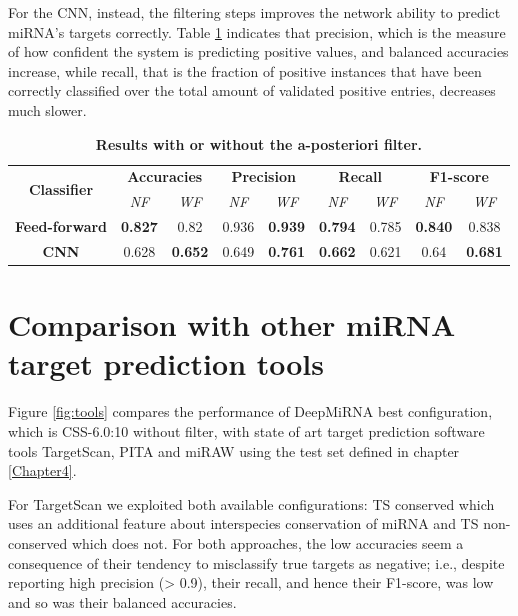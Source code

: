 For the CNN, instead, the filtering steps improves the network ability to predict miRNA's targets correctly. Table \ref{tab:sa_filter} indicates that precision, which is the measure of how confident the system is predicting positive values, and balanced accuracies increase, while recall, that is the fraction of positive instances that have been correctly classified over the total amount of validated positive entries, decreases much slower. 

\begin{table}[h!]
	\caption{\textbf{Results with or without the a-posteriori filter.}}
	\label{tab:sa_filter}
	\centering
	\begin{tabular}{| c | c | c | c | c | c | c | c | c |}
		\hline
		\multirow{2}{4.5em}{\textbf{Classifier}} & \multicolumn{2}{c|}{\textbf{Accuracies}} & \multicolumn{2}{c|}{\textbf{Precision}} & \multicolumn{2}{c|}{\textbf{Recall}} & \multicolumn{2}{c|}{\textbf{F1-score}} \\ 
		\cline{2-9}
		& \emph{NF} & \emph{WF} & \emph{NF} & \emph{WF} & \emph{NF} & \emph{WF} & \emph{NF} & \emph{WF} \\ 
		\hline
		\textbf{Feed-forward} & \textbf{0.827} & 0.82 & 0.936 & \textbf{0.939} & \textbf{0.794} & 0.785 & \textbf{0.840} & 0.838 \\ 
		\hline
		\textbf{CNN} & 0.628 & \textbf{0.652} & 0.649 & \textbf{0.761} & \textbf{0.662} & 0.621 & 0.64 & \textbf{0.681} \\ 
		\hline 
	\end{tabular}
\end{table}

\section{Comparison with other miRNA target prediction tools}

Figure \ref{fig:tools} compares the performance of DeepMiRNA best configuration, which is CSS-6.0:10 without filter, with state of art target prediction software tools TargetScan, PITA and miRAW using the test set defined in chapter \ref{Chapter4}.

For TargetScan we exploited both available configurations: TS conserved which uses an additional feature about interspecies conservation of miRNA and TS non-conserved which does not. For both approaches, the low accuracies seem a consequence of their tendency to misclassify true targets as negative; i.e., despite reporting high precision (> 0.9),
their recall, and hence their F1-score, was low and so was their balanced accuracies.

